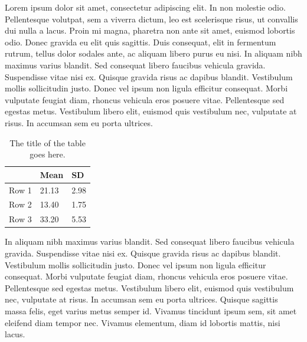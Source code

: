 Lorem ipsum dolor sit amet, consectetur adipiscing elit. In non molestie odio. Pellentesque volutpat, sem a viverra dictum, leo est scelerisque risus, ut convallis dui nulla a lacus. Proin mi magna, pharetra non ante sit amet, euismod lobortis odio. Donec gravida eu elit quis sagittis. Duis consequat, elit in fermentum rutrum, tellus dolor sodales ante, ac aliquam libero purus eu nisi. In aliquam nibh maximus varius blandit. Sed consequat libero faucibus vehicula gravida. Suspendisse vitae nisi ex. Quisque gravida risus ac dapibus blandit. Vestibulum mollis sollicitudin justo. Donec vel ipsum non ligula efficitur consequat. Morbi vulputate feugiat diam, rhoncus vehicula eros posuere vitae. Pellentesque sed egestas metus. Vestibulum libero elit, euismod quis vestibulum nec, vulputate at risus. In accumsan sem eu porta ultrices. 


\begin{table}[tbh]
\caption[The title of the table goes here.]{The title of the table goes here.}
\label{tab:table_example1_3}
\begin{center}
\begin{tabular}{lll}
      & Mean  & SD   \\ \hline
Row 1 & 21.13 & 2.98 \\ 
Row 2 & 13.40 & 1.75 \\ 
Row 3 & 33.20 & 5.53 \\ \hline
\end{tabular}
\end{center}
\end{table}

In aliquam nibh maximus varius blandit. Sed consequat libero faucibus vehicula gravida. Suspendisse vitae nisi ex. Quisque gravida risus ac dapibus blandit. Vestibulum mollis sollicitudin justo. Donec vel ipsum non ligula efficitur consequat. Morbi vulputate feugiat diam, rhoncus vehicula eros posuere vitae. Pellentesque sed egestas metus. Vestibulum libero elit, euismod quis vestibulum nec, vulputate at risus. In accumsan sem eu porta ultrices. Quisque sagittis massa felis, eget varius metus semper id. Vivamus tincidunt ipsum sem, sit amet eleifend diam tempor nec. Vivamus elementum, diam id lobortis mattis, nisi lacus.

